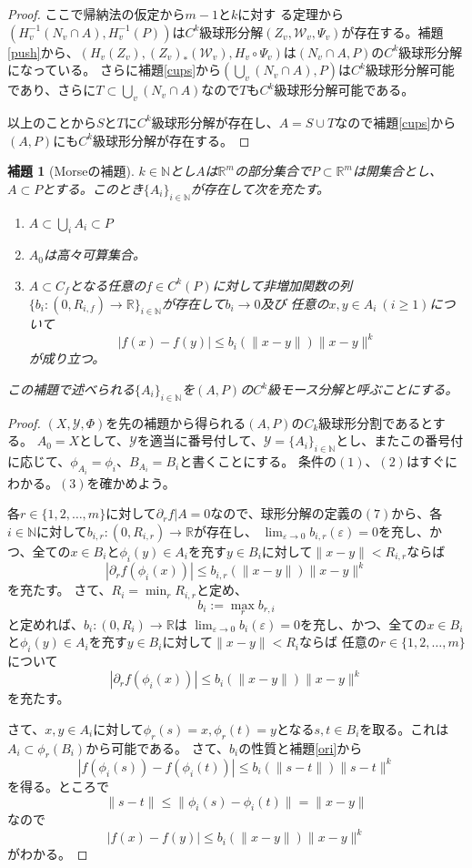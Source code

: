 \documentclass[leqno]{jsarticle}
\newtheorem{lem}[thm]{補題}
\newcommand{\nn}{\mathbb{N}}
\newcommand{\rr}{\mathbb{R}}
\newcommand{\ep}{\varepsilon}
\begin{document}
\begin{proof}
ここで帰納法の仮定から$m-1$と$k$に対す
る定理から$(H_v^{-1}(N_v\cap A), H_v^{-1}(P))$は$C^k$級球形分解$(Z_v,\mathcal{W}_v, \Psi_v)$が存在する。補題\ref{push}から、$(H_v(Z_v), (Z_v)_*(\mathcal{W}_v), H_v\circ \Psi_v)$は$(N_v\cap A,P)$の$C^k$級球形分解になっている。
さらに補題\ref{cups}から$(\bigcup_v(N_v\cap A),P)$は$C^k$級球形分解可能であり、さらに$T\subset\bigcup_v(N_v\cap A)$なので$T$も$C^k$級球形分解可能である。
\par
以上のことから$S$と$
T$に$C^k$級球形分解が存在し、$A=S\cup T$なので補題\ref{cups}から
$(A,P)$にも$C^k$級球形分解が存在する。
\end{proof}

\begin{lem}[Morseの補題]\label{mor}
$k\in \nn$とし$A$は$\rr^m$の部分集合で$P\subset \rr^m$は開集合とし、$A\subset P$とする。このとき$\{A_i\}_{i\in \nn}$が存在して次を充たす。
\begin{enumerate}
\item $A\subset \bigcup_{i}A_i\subset P$
\item $A_0$は高々可算集合。
\item $A\subset C_f$となる任意の$f\in C^k(P)$に対して非増加関数の列$\{b_i:(0,R_{i,f})\to \rr\}_{i\in \nn}$が存在して$b_i\to 0$及び
任意の$x, y\in A_i\ (i\ge 1)$について
\[
|f(x)-f(y)|\le b_i(\|x-y\|)\|x-y\|^k
\]
が成り立つ。
\end{enumerate}
この補題で述べられる$\{A_i\}_{i\in \nn}$を$(A,P)$の$C^k$級モース分解と呼ぶことにする。
\end{lem}
\begin{proof}
$(X,\mathcal{Y},\Phi)$を先の補題から得られる$(A,P)$の$C_k$級球形分割であるとする。
$A_0=X$として、$\mathcal{Y}$を適当に番号付して、$\mathcal{Y}=\{A_i\}_{i\in \nn}$とし、またこの番号付に応じて、$\phi_{A_i}=\phi_i$、$B_{A_i}=B_i$と書くことにする。
条件の$(1)$、$(2)$はすぐにわかる。$(3)$を確かめよう。

各$r\in \{1,2,\dots, m\}$に対して$\partial_rf|A=0$なので、球形分解の定義の$(7)$から、各$i\in \nn$に対して$b_{i,r}:(0, R_{i,r})\to \rr$が存在し、
$\lim_{\ep\to 0}b_{i,r}(\ep)=0$を充し、かつ、全ての$x\in B_i$と$\phi_i(y)\in A_i$を充す$y\in B_i$に対して$\|x-y\|<R_{i,r}$ならば
\[
|\partial_rf(\phi_i(x))|\le b_{i,r}(\|x-y\|)\|x-y\|^k
\]
を充たす。
さて、$R_i=\min_rR_{i,r}$と定め、
\[
b_{i}:=\max_r b_{r,i}
\]
と定めれば、$b_i:(0,R_i)\to \rr$は
$\lim_{\ep\to 0}b_{i}(\ep)=0$を充し、かつ、全ての$x\in B_i$と$\phi_i(y)\in A_i$を充す$y\in B_i$に対して$\|x-y\|<R_{i}$ならば
任意の$r\in \{1,2,\dots, m\}$について
\[
|\partial_rf(\phi_i(x))|\le b_{i}(\|x-y\|)\|x-y\|^k
\]
を充たす。

さて、$x,y\in A_i$に対して$\phi_r(s)=x, \phi_r(t)=y$となる$s,t\in B_i$を取る。これは$A_i\subset \phi_r(B_i)$から可能である。
さて、$b_i$の性質と補題\ref{ori}から
\[
|f(\phi_i(s))-f(\phi_i(t))|\le b_i(\|s-t\|)\|s-t\|^k
\]
を得る。ところで
\[
\|s-t\| \le \|\phi_i(s)-\phi_i(t)\|=\|x-y\|
\]
なので
\[
|f(x)-f(y)|\le b_i(\|x-y\|)\|x-y\|^k
\]
がわかる。
\end{proof}
\end{document}
